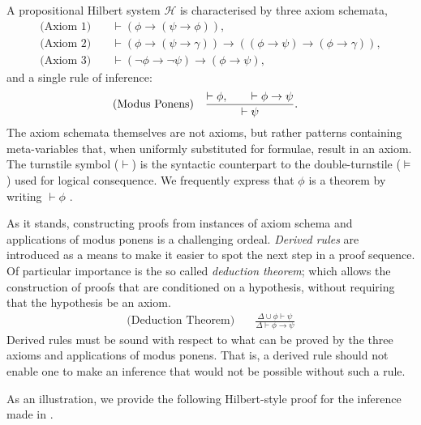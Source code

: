 A propositional Hilbert system $\mathcal{H}$ is characterised by three axiom schemata, 
\begin{align}
    \text{(Axiom 1)} \quad & \vdash (\phi \rightarrow (\psi \rightarrow \phi)),  \\ 
    \text{(Axiom 2)} \quad & \vdash (\phi \rightarrow (\psi \rightarrow \gamma)) \rightarrow ((\phi \rightarrow \psi) \rightarrow (\phi \rightarrow \gamma)), \\
    \text{(Axiom 3)} \quad & \vdash (\neg \phi \rightarrow \neg \psi) \rightarrow (\phi \rightarrow \psi),
\end{align}
%
and a single rule of inference:
%
\begin{align}
     \index{Rule of inference! \textit{modus ponens}}
     \text{(Modus Ponens)} \quad & \frac{\vdash \phi, \qquad \vdash \phi \rightarrow \psi}{\vdash \psi}.
\end{align}
%
The axiom schemata themselves are not axioms, but rather patterns containing meta-variables that, when uniformly substituted for formulae, result in an axiom. The turnstile symbol ($\vdash$) is the syntactic counterpart to the double-turnstile ($\vDash$) used for logical consequence. We frequently express that $\phi$ is a theorem by writing $\vdash \phi$ \cite[p. 55]{Ben1993Mathematical}.

As it stands, constructing proofs from instances of axiom schema and applications of modus ponens is a challenging ordeal. \textit{Derived rules} are introduced as a means to make it easier to spot the next step in a proof sequence. Of particular importance is the so called \textit{deduction theorem}; which allows the construction of proofs that are conditioned on a hypothesis, without requiring that the hypothesis be an axiom. 
%
\begin{align}
     \text{(Deduction Theorem)} \quad & \frac{\Delta \cup \phi \vdash \psi}{\Delta \vdash \phi \rightarrow \psi}
\end{align}
%
Derived rules must be sound with respect to what can be proved by the three axioms and applications of modus ponens. That is, a derived rule should not enable one to make an inference that would not be possible without such a rule. 

As an illustration, we provide the following Hilbert-style proof for the inference made in . 

